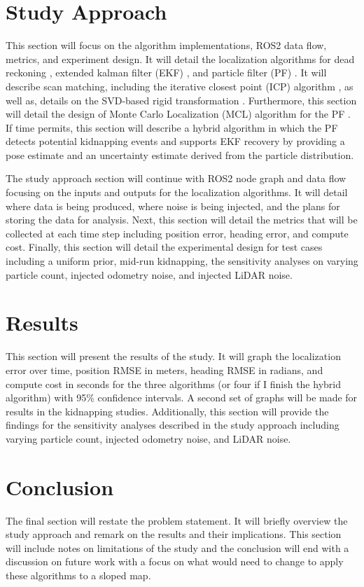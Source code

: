 \documentclass[conf]{new-aiaa}
\begin{document}
\section{Study Approach}\label{Study-Approach}
This section will focus on the algorithm implementations, ROS2 data flow, metrics, and experiment design.
It will detail the localization algorithms for dead reckoning \cite{ros2_control_mobile_robot_kinematics}, extended kalman filter (EKF) \cite{leonard1991mobile}, and particle filter (PF) \cite{doucet2000sequential}.
It will describe scan matching, including the iterative closest point (ICP) algorithm \cite{besl1992method}, as well as, details on the SVD-based rigid transformation \cite{arun1987least}.
Furthermore, this section will detail the design of Monte Carlo Localization (MCL) algorithm for the PF \cite{fox1999monte}.
If time permits, this section will describe a hybrid algorithm in which the PF detects potential kidnapping events and supports EKF recovery by providing a pose estimate and an uncertainty estimate derived from the particle distribution.

The study approach section will continue with ROS2 node graph and data flow focusing on the inputs and outputs for the localization algorithms.
It will detail where data is being produced, where noise is being injected, and the plans for storing the data for analysis.
Next, this section will detail the metrics that will be collected at each time step including position error, heading error, and compute cost.
Finally, this section will detail the experimental design for test cases including a uniform prior, mid-run kidnapping, the sensitivity analyses on varying particle count, injected odometry noise, and injected LiDAR noise.

\section{Results}\label{Results}
This section will present the results of the study.
It will graph the localization error over time, position RMSE in meters, heading RMSE in radians, and compute cost in seconds for the three algorithms (or four if I finish the hybrid algorithm) with 95\% confidence intervals.
A second set of graphs will be made for results in the kidnapping studies.
Additionally, this section will provide the findings for the sensitivity analyses described in the study approach including varying particle count, injected odometry noise, and LiDAR noise.

\section{Conclusion}\label{Conclusion}
The final section will restate the problem statement.
It will briefly overview the study approach and remark on the results and their implications.
This section will include notes on limitations of the study and the conclusion will end with a discussion on future work with a focus on what would need to change to apply these algorithms to a sloped map.


\end{document}
